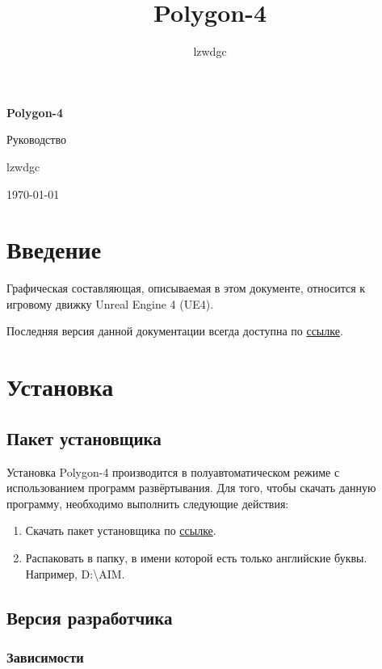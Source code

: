 \documentclass[a4paper,12pt]{report}
\author{lzwdgc}
\title{Polygon-4}
\newcommand{\ue}{UE4\xspace}
\newcommand{\pf}{Polygon-4\xspace}
\begin{document}
\large %

\begin{titlepage}
\centering
{\huge\bfseries Polygon-4\par}
\vspace{1.5cm}
{\Large Руководство\par}
\vspace{1.5cm}
lzwdgc
\vfill
{\today\par}
\end{titlepage}

\tableofcontents

\chapter*{Введение}

Графическая составляющая, описываемая в этом документе, относится к игровому движку Unreal Engine 4 (\ue).

Последняя версия данной документации всегда доступна по \href{https://www.dropbox.com/s/ipnakg5civ0xp0g/Polygon4_ru.pdf?dl=1}{ссылке}.

\chapter{Установка}

\section{Пакет установщика}

Установка \pf производится в полуавтоматическом режиме с использованием программ развёртывания.
Для того, чтобы скачать данную программу, необходимо выполнить следующие действия:

\begin{enumerate}
\item Скачать пакет установщика по \href{https://www.dropbox.com/s/0zhbgb1ftspcv9w/polygon4.zip?dl=1}{ссылке}.
\item Распаковать в папку, в имени которой есть только английские буквы. Например, D:\backslash AIM.
\end{enumerate}


\section{Версия разработчика}

\subsection{Зависимости}
\end{document}
